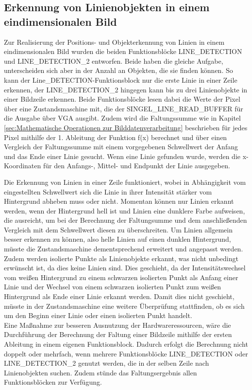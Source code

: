 \documentclass[ngerman,12pt]{article} %
\begin{document}
{\subsection{Erkennung von Linienobjekten in einem eindimensionalen Bild}
\label{sec:Erkennung einer Linie in einem eindimensionalen Bild}
Zur Realisierung der Positions- und Objekterkennung von Linien in einem eindimensionalen Bild wurden die beiden Funktionsblöcke LINE\_DETECTION und LINE\_DETECTION\_2 entworfen. Beide haben die gleiche Aufgabe, unterscheiden sich aber in der Anzahl an Objekten, die sie finden können. So kann der Line\_DETECTION-Funktionsblock nur die erste Linie in einer Zeile erkennen, der LINE\_DETECTION\_2 hingegen kann bis zu drei Linienobjekte in einer Bildzeile erkennen. Beide Funktionsblöcke lesen dabei die Werte der Pixel über eine Zustandsmaschine mit, die der SINGEL\_LINE\_READ\_BUFFER für die Ausgabe über VGA ausgibt. Zudem wird die Faltungssumme wie in Kapitel \ref{sec:Mathematische Operationen zur Bilddatenverarbeitung} beschrieben für jedes Pixel mithilfe der 1. Ableitung der Funktion f(x) berechnet und über einen Vergleich der Faltungssumme  mit einem vorgegebenen Schwellwert der Anfang und das Ende einer Linie gesucht. Wenn eine Linie gefunden wurde, werden die x-Koordinaten für den Anfangs-, Mittel- und Endpunkt der Linie ausgegeben.\newline

Die Erkennung von Linien in einer Zeile funktioniert, wobei in Abhängigkeit vom eingestellten Schwellwert sich die Linie in ihrer Intensität stärker vom Hintergrund abheben muss oder nicht. Momentan können nur Linien erkannt werden, wenn der Hintergrund hell ist und Linien eine dunklere Farbe aufweisen, die ausreicht, um bei der Berechnung der Faltungsumme und dem anschließenden Vergleich mit dem Schwellwert diesen zu überschreiten. Um Linien allgemein besser erkennen zu können, also helle Linien auf einen dunklen Hintergrund, müsste die Zustandsmaschine dementsprechend erweitert und angepasst werden.\\
Zudem werden isolierte Punkte als Linienobjekte erkannt, was nicht unbedingt erwünscht ist, da dies keine Linien sind. Dies geschieht, da der Intensitätswechsel vom weißen Hintergrund zu einem schwarzen isolierten Punkt als Anfang einer Linie und der Wechsel von einem schwarzen isolierten Punkt zum weißen Hintergrund als Ende einer Linie erkannt werden. Damit dies nicht geschieht, müsste in der Zustandsmaschine eine weitere Überprüfung stattfinden, ob es sich um den Beginn einer Linie oder einen isolierten Punkt handelt.\\
Eine Maßnahme zur besseren Ausnutzung der Hardwareressourcen, wäre die Durchführung der Berechnung der Faltung einer Bildzeile mithilfe der ersten Ableitung in einem eigenen Funktionsblock. Dadurch erfolgt die Berechnung nicht doppelt oder mehrfach, wenn mehrere Funktionsblöcke LINE\_DETECTION oder LINE\_DETECTION\_2 genutzt werden, die in der selben Zeile nach Linienobjekten suchen. Zudem stünde das Faltungsergebnis allen Funktionsblöcken zur Verfügung.



}
\end{document}
